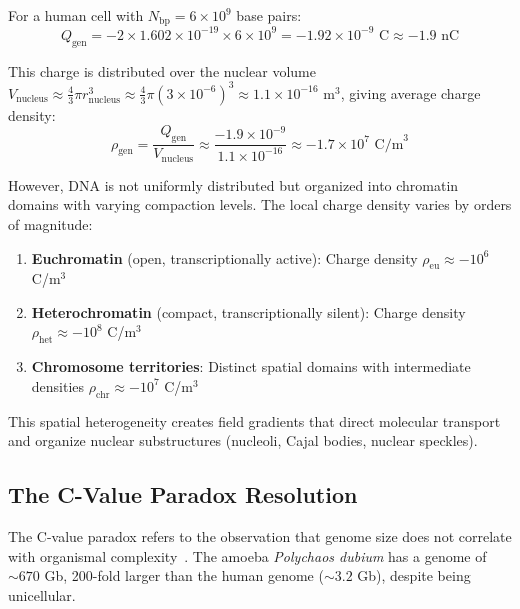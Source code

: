 \documentclass[twocolumn,10pt,aps,prd,superscriptaddress,floatfix,nofootinbib]{revtex4-2}
\theoremstyle{remark}
\begin{document}
For a human cell with $N_{\mathrm{bp}} = 6 \times 10^9$ base pairs:
\begin{equation}
Q_{\mathrm{gen}} = -2 \times 1.602 \times 10^{-19} \times 6 \times 10^9 = -1.92 \times 10^{-9} \text{ C} \approx -1.9 \text{ nC}
\end{equation}

This charge is distributed over the nuclear volume $V_{\mathrm{nucleus}} \approx \frac{4}{3}\pi r_{\mathrm{nucleus}}^3 \approx \frac{4}{3}\pi (3 \times 10^{-6})^3 \approx 1.1 \times 10^{-16}$ m$^3$, giving average charge density:
\begin{equation}
\rho_{\mathrm{gen}} = \frac{Q_{\mathrm{gen}}}{V_{\mathrm{nucleus}}} \approx \frac{-1.9 \times 10^{-9}}{1.1 \times 10^{-16}} \approx -1.7 \times 10^{7} \text{ C/m}^3
\end{equation}

However, DNA is not uniformly distributed but organized into chromatin domains with varying compaction levels. The local charge density varies by orders of magnitude:

\begin{enumerate}
\item \textbf{Euchromatin} (open, transcriptionally active): Charge density $\rho_{\mathrm{eu}} \approx -10^{6}$ C/m$^3$

\item \textbf{Heterochromatin} (compact, transcriptionally silent): Charge density $\rho_{\mathrm{het}} \approx -10^{8}$ C/m$^3$

\item \textbf{Chromosome territories}: Distinct spatial domains with intermediate densities $\rho_{\mathrm{chr}} \approx -10^{7}$ C/m$^3$
\end{enumerate}

This spatial heterogeneity creates field gradients that direct molecular transport and organize nuclear substructures (nucleoli, Cajal bodies, nuclear speckles).

\subsection{The C-Value Paradox Resolution}

The C-value paradox refers to the observation that genome size does not correlate with organismal complexity~\cite{Gregory2005}. The amoeba \textit{Polychaos dubium} has a genome of $\sim 670$ Gb, 200-fold larger than the human genome ($\sim 3.2$ Gb), despite being unicellular.
\end{document}
